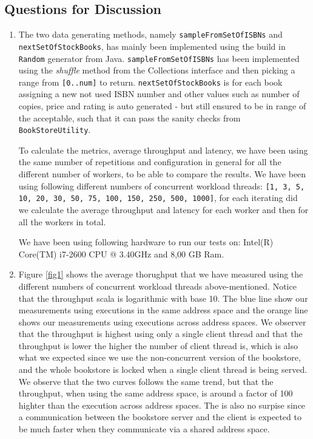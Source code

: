 \documentclass[10pt,a4paper]{article}
\begin{document}
\subsection*{Questions for Discussion}
\begin{enumerate}
	\item The two data generating methods, namely \texttt{sampleFromSetOfISBNs} and \texttt{nextSetOfStockBooks}, has mainly been implemented using the build in \texttt{Random} generator from Java. \texttt{sampleFromSetOfISBNs} has been implemented using the \textit{shuffle} method from the Collections interface and then picking a range from \texttt{[0..num]} to return. \texttt{nextSetOfStockBooks} is for each book assigning a new not used ISBN number and other values such as number of copies, price and rating is auto generated - but still ensured to be in range of the acceptable, such that it can pass the sanity checks from \texttt{BookStoreUtility}.
	\newline
	
	To calculate the metrics, average throughput and latency, we have been using the same number of repetitions and configuration in general for all the different number of workers, to be able to compare the results. We have been using following different numbers of concurrent workload threads: \texttt{[1, 3, 5, 10, 20, 30, 50, 75, 100, 150, 250, 500, 1000]}, for each iterating did we calculate the average throughput and latency for each worker and then for all the workers in total.
	\newline
	
	We have been using following hardware to run our tests on: Intel(R) Core(TM) i7-2600 CPU @ 3.40GHz and 8,00 GB Ram.

	\item 
	Figure \ref{fig1} shows the average thorughput that we have measured using the different numbers of concurrent workload threads above-mentioned. Notice that the throughput scala is logarithmic with base 10. The blue line show our measurements using executions in the same address space and the orange line shows our measurements using executions across address spaces. We observer that the throughput is highest using only a single client thread and that the throughput is lower the higher the number of client thread is, which is also what we expected since we use the non-concurrent version of the bookstore, and the whole bookstore is locked when a single client thread is being served. We observe that the two curves follows the same trend, but that the throughput, when using the same address space, is around a factor of 100 highter than the execution across address spaces. The is also no surpise since a communication between the bookstore server and the client is expected to be much faster when they communicate via a shared address space. \\
	


\end{enumerate}
\end{document}
